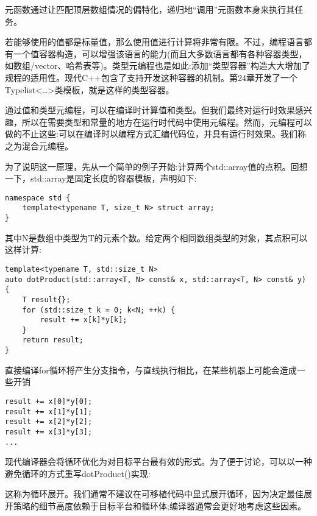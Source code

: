 元函数通过让匹配顶层数组情况的偏特化，递归地“调用”元函数本身来执行其任务。

若能够使用的值都是标量值，那么使用值进行计算将非常有限。不过，编程语言都有一个值容器构造，可以增强该语言的能力(而且大多数语言都有各种容器类型，如数组/vector、哈希表等)。类型元编程也是如此:添加“类型容器”构造大大增加了规程的适用性。现代C++包含了支持开发这种容器的机制。第24章开发了一个Typelist<…>类模板，就是这样的类型容器。


通过值和类型元编程，可以在编译时计算值和类型。但我们最终对运行时效果感兴趣，所以在需要类型和常量的地方在运行时代码中使用元编程。然而，元编程可以做的不止这些:可以在编译时以编程方式汇编代码位，并具有运行时效果。我们称之为混合元编程。

为了说明这一原理，先从一个简单的例子开始:计算两个std::array值的点积。回想一下，std::array是固定长度的容器模板，声明如下:

\begin{lstlisting}[style=styleCXX]
namespace std {
	template<typename T, size_t N> struct array;
}
\end{lstlisting}

其中N是数组中类型为T的元素个数。给定两个相同数组类型的对象，其点积可以这样计算:

\begin{lstlisting}[style=styleCXX]
template<typename T, std::size_t N>
auto dotProduct(std::array<T, N> const& x, std::array<T, N> const& y)
{
	T result{};
	for (std::size_t k = 0; k<N; ++k) {
		result += x[k]*y[k];
	}
	return result;
}
\end{lstlisting}

直接编译for循环将产生分支指令，与直线执行相比，在某些机器上可能会造成一些开销

\begin{lstlisting}[style=styleCXX]
result += x[0]*y[0];
result += x[1]*y[1];
result += x[2]*y[2];
result += x[3]*y[3];
...
\end{lstlisting}

现代编译器会将循环优化为对目标平台最有效的形式。为了便于讨论，可以以一种避免循环的方式重写dotProduct()实现:

\begin{tcolorbox}[colback=webgreen!5!white,colframe=webgreen!75!black]
\hspace*{0.75cm}这称为循环展开。我们通常不建议在可移植代码中显式展开循环，因为决定最佳展开策略的细节高度依赖于目标平台和循环体;编译器通常会更好地考虑这些因素。
\end{tcolorbox}

